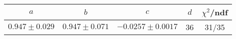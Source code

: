 \begin{tabular}{c|c|c|c|c}
$a$ & $b$ & $c$ & $d$ & $\chi^2$/ndf \\
\hline
$0.947\pm0.029$ & $0.947\pm0.071$ & $-0.0257\pm0.0017$ & 36 & 31/35
\end{tabular}
